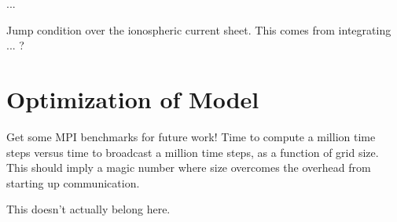 ...

Jump condition over the ionospheric current sheet. This comes from integrating \amplaw... ?

\section{Optimization of Model}

Get some MPI benchmarks for future work! Time to compute a million time steps versus time to broadcast a million time steps, as a function of grid size. This should imply a magic number where size overcomes the overhead from starting up communication. 

This doesn't actually belong here. 





